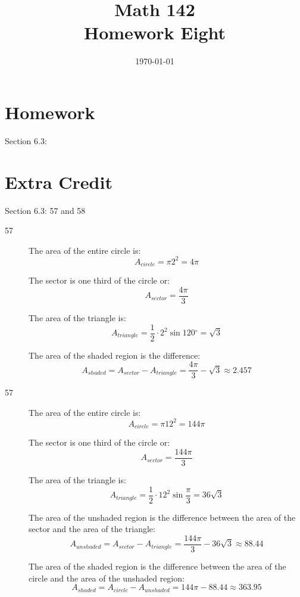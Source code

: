 \documentclass{exam}
\author{}
\date{\today}
\title{Math 142 \\ Homework Eight}
\newcommand{\dg}{\ensuremath{^\circ}}
\begin{document}
  \maketitle

  \section{Homework}
  Section 6.3: 

  \section{Extra Credit}
  Section 6.3: 57 and 58

  \ifprintanswers
    \begin{description}
      \item[57]
        The area of the entire circle is: 
        \[
          A_{circle} = \pi 2^2 = 4 \pi
        \]

        The sector is one third of the circle or: 
        \[
          A_{sector} = \frac{4 \pi}{3}
        \]

        The area of the triangle is: 
        \[
          A_{triangle} = \frac{1}{2} \cdot 2^2 \sin 120 \dg = \sqrt{3}
        \]

        The area of the shaded region is the difference:
        \[
          A_{shaded} = A_{sector} - A_{triangle} = \frac{4 \pi}{3} - \sqrt{3} \approx \boxed{ 2.457 }
        \]

      \item[57]
        The area of the entire circle is: 
        \[
          A_{circle} = \pi 12^2 = 144 \pi
        \]

        The sector is one third of the circle or: 
        \[
          A_{sector} = \frac{144 \pi}{3}
        \]

        The area of the triangle is: 
        \[
          A_{triangle} = \frac{1}{2} \cdot 12^2 \sin \frac{\pi}{3} = 36 \sqrt{3}
        \]

        The area of the unshaded region is the difference between the area of the sector and the area of the triangle:
        \[
          A_{unshaded} = A_{sector} - A_{triangle} = \frac{144 \pi}{3} - 36 \sqrt{3} \approx 88.44
        \]

        The area of the shaded region is the difference between the area of the circle and the area of the unshaded
        region:
        \[
          A_{shaded} = A_{circle} - A_{unshaded} = 144 \pi - 88.44 \approx \boxed{ 363.95 }
        \]
      \end{description}
\end{document}
